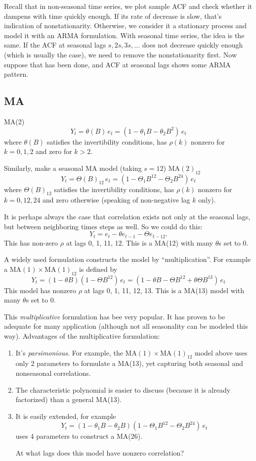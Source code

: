 \documentclass[12pt]{article}
\begin{document}
Recall that in non-seasonal time series,
we plot sample ACF and check whether it dampens with time quickly
enough.
If its rate of decrease is slow, that's indication of nonstationarity.
Otherwise, we consider it a stationary process and model it with an ARMA
formulation.
With seasonal time series, the idea is the same.
If the ACF at seasonal lags $s, 2s, 3s,\dotsc$ does not decrease quickly
enough (which is usually the case), we need to remove the
nonstationarity first.
Now suppose that has been done,
and ACF at seasonal lags shows some ARMA pattern.

\subsection{MA}

MA(2)
\[
Y_t
= \theta(B) \, e_t
=  (1 - \theta_1 B - \theta_2 B^2) \, e_t
\]
where $\theta(B)$ satisfies the invertibility conditions,
has $\rho(k)$ nonzero for $k=0,1,2$ and zero for $k > 2$.

Similarly,
make a seasonal MA model (taking $s = 12$)
$\text{MA}(2)_{12}$
\[
Y_t
= \Theta(B)_{12} \, e_t
= (1 - \Theta_1 B^{12} - \Theta_2 B^{24}) \, e_t
\]
where $\Theta(B)_{12}$ satisfies the invertibility conditions,
has $\rho(k)$ nonzero for $k=0,12,24$ and zero otherwise
(speaking of non-negative lag $k$ only).

It is perhaps always the case that
correlation exists not only at the seasonal lags,
but between neighboring times steps as well.
So we could do this:
\[
Y_t = e_t - \theta e_{t-1} - \Theta e_{t-12}
.
\]
This has non-zero $\rho$ at lags 0, 1, 11, 12.
This is a MA(12) with many $\theta$s set to 0.

A widely used formulation constructs the model by
``multiplication''.
For example
a $\text{MA}(1) \times \text{MA}(1)_{12}$ is defined by
\[
Y_t
= (1 - \theta B)(1 - \Theta B^{12}) \, e_t
= (1 - \theta B - \Theta B^{12} + \theta\Theta B^{13}) \, e_t
\]
This model has nonzero $\rho$ at lags
0, 1, 11, 12, 13.
This is a MA(13) model with many $\theta$s set to 0.

This \emph{multiplicative} formulation has bee very popular.
It has proven to be adequate for many application
(although not all seasonality can be modeled this way).
Advantages of the multiplicative formulation:
\begin{enumerate}
\item It's \emph{parsimonious}.
    For example, the 
    $\text{MA}(1) \times \text{MA}(1)_{12}$ model above
    uses only 2 parameters to formulate a MA(13),
    yet capturing both seasonal and nonseasonal correlations.
\item The characteristic polynomial is easier to discuss
    (because it is already factorized) than a general MA(13).
\item It is easily extended, for example
    \[
    Y_t = (1 - \theta_1 B - \theta_2 B)
        (1 - \Theta_1 B^{12} - \Theta_2 B^{24}) \, e_t
    \]
    uses 4 parameters to construct a MA(26).

\exercise
    At what lags does this model have nonzero correlation?
\end{enumerate}
\end{document}
